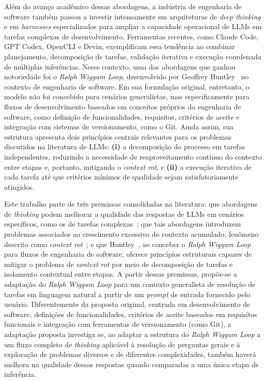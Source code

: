 \documentclass[a4paper,10pt,twocolumn]{article}
\begin{document}
Além do avanço acadêmico dessas abordagens, a indústria de engenharia de software também passou a investir intensamente em arquiteturas de \textit{deep thinking} e em \textit{harnesses} especializados para ampliar a capacidade operacional de LLMs em tarefas complexas de desenvolvimento. Ferramentas recentes, como Claude Code, GPT Codex, OpenCLI e Devin, exemplificam essa tendência ao combinar planejamento, decomposição de tarefas, validação iterativa e execução coordenada de múltiplas inferências. Nesse contexto, uma das abordagens que ganhou notoriedade foi o \textit{Ralph Wiggum Loop}, desenvolvido por Geoffrey Huntley~\cite{ghuntley2025ralph} no contexto de engenharia de software. Em sua formulação original, entretanto, o modelo não foi concebido para cenários generalistas, mas especificamente para fluxos de desenvolvimento baseados em conceitos próprios da engenharia de software, como definição de funcionalidades, requisitos, critérios de aceite e integração com sistemas de versionamento, como o Git. Ainda assim, sua estrutura apresenta dois princípios centrais relevantes para os problemas discutidos na literatura de LLMs: \textbf{(i)} a decomposição do processo em tarefas independentes, reduzindo a necessidade de reaproveitamento contínuo do contexto entre etapas e, portanto, mitigando o \textit{context rot}, e \textbf{(ii)} a execução iterativa de cada tarefa até que critérios mínimos de qualidade sejam satisfatoriamente atingidos.

Este trabalho parte de três premissas consolidadas na literatura: que abordagens de \textit{thinking} podem melhorar a qualidade das respostas de LLMs em cenários específicos, como os de tarefas complexas~\cite{wei2022chain, yao2023tree}; que tais abordagens introduzem problemas associados ao crescimento excessivo do contexto acumulado, fenômeno descrito como \textit{context rot}~\cite{hong2025context}; e que Huntley~\cite{ghuntley2025ralph}, ao conceber o \textit{Ralph Wiggum Loop} para fluxos de engenharia de software, oferece princípios estruturais capazes de mitigar o problema de \textit{context rot} por meio de decomposição de tarefas e isolamento contextual entre etapas. A partir dessas premissas, propõe-se a adaptação do \textit{Ralph Wiggum Loop} para um contexto generalista de resolução de tarefas em linguagem natural a partir de um \textit{prompt} de entrada fornecido pelo usuário. Diferentemente da proposta original, centrada em desenvolvimento de software, definições de funcionalidades, critérios de aceite baseados em requisitos funcionais e integração com ferramentas de versionamento (como Git), a adaptação proposta investiga se, ao adaptar a estrutura do \textit{Ralph Wiggum Loop} a um fluxo completo de \textit{thinking} aplicável à resolução de perguntas gerais e à exploração de problemas diversos e de diferentes complexidades, também haverá melhora na qualidade dessas respostas quando comparadas a uma única etapa de inferência.
\end{document}
